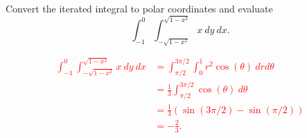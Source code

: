 \documentclass[12pt,reqno]{amsart}
\begin{document}
\prob Convert the iterated integral to polar coordinates and evaluate
	\[\int_{-1}^0 \int_{-\sqrt{1-x^2}}^{\sqrt{1-x^2}} x \ dy \ dx.
	\]

\bigskip
\textcolor{red}{
\begin{align*}
\int_{-1}^0 \int_{-\sqrt{1-x^2}}^{\sqrt{1-x^2}} x \ dy \ dx &= \int_{\pi/2}^{3\pi/2} \int_0^1 r^2 \cos{(\theta)} \ drd\theta \\
&= \frac{1}{3} \int_{\pi/2}^{3\pi/2} \cos{(\theta)} \ d\theta \\
&= \frac{1}{3}( \sin{(3\pi/2)} - \sin{(\pi/2)}) \\
&= -\frac{2}{3}. 
\end{align*}}
\end{document}

